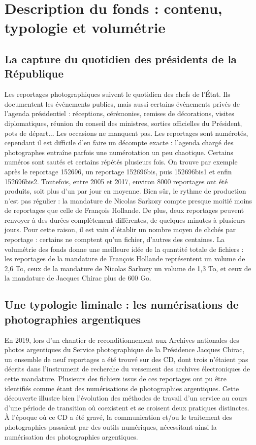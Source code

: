 \section{Description du fonds : contenu, typologie et volumétrie}

\subsection*{La capture du quotidien des présidents de la République}

Les reportages photographiques suivent le quotidien des chefs de l'État. Ils documentent les événements publics, mais aussi certains événements privés de l'agenda présidentiel : réceptions, cérémonies, remises de décorations, visites diplomatiques, réunion du conseil des ministres, sorties officielles du Président, pots de départ... Les occasions ne manquent pas. Les reportages sont numérotés, cependant il est difficile d'en faire un décompte exacte : l'agenda chargé des photographes entraîne parfois une numérotation un peu chaotique. Certains numéros sont sautés et certains répétés plusieurs fois. On trouve par exemple après le reportage 152696, un reportage 152696bis, puis 152696bis1 et enfin 152696bis2. Toutefois, entre 2005 et 2017, environ 8000 reportages ont été produits, soit plus d'un par jour en moyenne. Bien sûr, le rythme de production n'est pas régulier : la mandature de Nicolas Sarkozy compte presque moitié moins de reportages que celle de François Hollande. De plus, deux reportages peuvent renvoyer à des durées complètement différentes, de quelques minutes à plusieurs jours. Pour cette raison, il est vain d'établir un nombre moyen de clichés par reportage : certains ne comptent qu'un fichier, d'autres des centaines. La volumétrie des fonds donne une meilleure idée de la quantité totale de fichiers : les reportages de la mandature de François Hollande représentent un volume de 2,6 To, ceux de la mandature de Nicolas Sarkozy un volume de 1,3 To, et ceux de la mandature de Jacques Chirac plus de 600 Go.

\subsection*{Une typologie liminale : les numérisations de photographies argentiques}

En 2019, lors d'un chantier de reconditionnement aux Archives nationales des photos argentiques du Service photographique de la Présidence  Jacques Chirac, un ensemble de neuf reportages a été trouvé sur des CD, dont trois n'étaient pas décrits dans l'instrument de recherche du versement des archives électroniques de cette mandature. Plusieurs des fichiers issus de ces reportages ont pu être identifiés comme étant des numérisations de photographies argentiques. Cette découverte illustre bien l'évolution des méthodes de travail d'un service au cours d'une période de transition où coexistent et se croisent deux pratiques distinctes.  À l'époque où ce CD a été gravé, la communication et/ou le traitement des photographies passaient par des outils numériques, nécessitant ainsi la numérisation des photographies argentiques.

